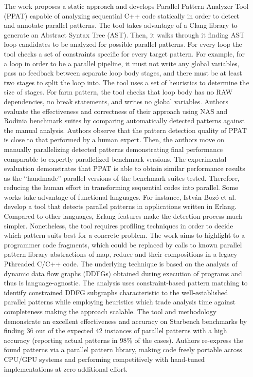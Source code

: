 \quad The work \cite{skeletons-static} proposes a static approach and develops Parallel Pattern Analyzer Tool (PPAT) capable of analyzing sequential C++ code statically in order to detect and annotate parallel patterns. The tool takes advantage of a Clang library to generate an Abstract Syntax Tree (AST). Then, it walks through it finding AST loop candidates to be analyzed for possible parallel patterns. For every loop the tool checks a set of constraints specific for every target pattern. For example, for a loop in order to be a parallel pipeline, it must not write any global variables, pass no feedback between separate loop body stages, and there must be at least two stages to split the loop into. The tool uses a set of heuristics to determine the size of stages. For farm pattern, the tool checks that loop body has no RAW dependencies, no break statements, and writes no global variables. Authors evaluate the effectiveness and correctness of their approach using NAS \cite{nasa-parallel-benchmarks} and Rodinia benchmark suites by comparing automatically detected patterns against the manual analysis. Authors observe that the pattern detection quality of PPAT is close to that performed by a human expert. Then, the authors move on manually parallelizing detected patterns demonstrating final performance comparable to expertly parallelized benchmark versions. The experimental evaluation demonstrates that PPAT is able to obtain similar performance results as the “handmade” parallel versions of the benchmark suites tested. Therefore, reducing the human effort in transforming sequential codes into parallel.\newline\null
\quad Some works take advantage of functional languages. For instance, István Bozó et al. \cite{10.1145/2633448.2633453} develop a tool that detects parallel patterns in applications written in Erlang. Compared to other languages, Erlang
features make the detection process much simpler. Nonetheless, the tool requires profiling techniques in order to decide which pattern suits best for a concrete problem.\newline\null
\quad The work \cite{roberto-lozano-skeletons} aims to highlight to a programmer code fragments, which could be replaced by calls to known parallel pattern library abstractions of map, reduce and their compositions in a legacy Pthreaded C/C++ code. The underlying technique is based on the analysis of dynamic data flow graphs (DDFGs) obtained during execution of programs and thus is language-agnostic. The analysis uses constraint-based pattern matching to identify constrained DDFG subgraphs characteristic to the well-established parallel patterns while employing heuristics which trade analysis time against completeness making the approach scalable. The tool and methodology demonstrate an excellent effectiveness and accuracy on Starbench benchmarks by finding 36 out of the expected 42 instances of parallel patterns with a high accuracy (reporting actual patterns in 98\% of the cases). Authors re-express the found patterns via a parallel pattern library, making code freely portable across CPU/GPU systems and performing competitively with hand-tuned implementations at zero additional effort.\newline\null
